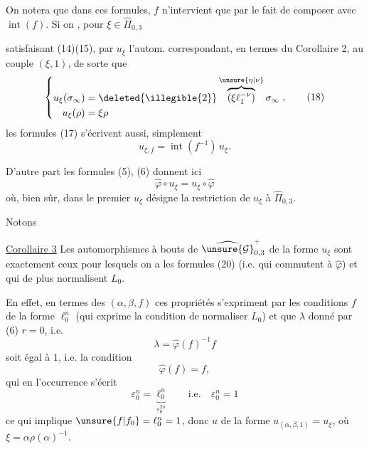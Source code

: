 On notera que dans ces formules, $f$ n'intervient que par le fait de
composer avec $\operatorname{int}(f)$. Si on
, pour $\xi\in\widehat\Pi_{0,3}$


satisfaisant (14)(15), par $u_\xi$ l'autom.
 correspondant, en termes du
Corollaire 2, au couple $(\xi,1)$, de sorte que
\[
\left\{\begin{aligned}
u_\xi(\sigma_\infty)
 &=\deleted{\illegible{2}}
 \overbrace{(\xi\ell_1^{-\nu})}^{\unsure{\eta|\nu}}\sigma_\infty\\
u_\xi(\rho)&=\xi\rho
\end{aligned}\right.,
\tag{18}
\]
les formules (17) s'écrivent aussi, simplement
\[
u_{\xi,f}=\operatorname{int}(f^{-1})\,u_\xi.
\tag{19}
\]

D'autre part les formules (5), (6) donnent ici
\[
\widehat\varphi\circ u_\xi=u_\xi\circ\widehat\varphi
\tag{20}
\]
où, bien sûr, dans le premier  $u_\xi$ désigne la
restriction de $u_\xi$ à $\widehat\Pi_{0,3}$.

Notons

\uline{Corollaire 3} Les automorphismes à bouts de
$\widehat{\unsure{\mathcal G}}_{0,3}^{+}$ de la forme $u_\xi$
 sont exactement ceux pour
lesquels on a les  formules (20) (i.e. qui
 commutent à $\widehat\varphi$) et qui de plus
normalisent $L_0$.


En effet, en termes des  $(\alpha,\beta,f)$  ces propriétés s'expriment par les conditions   $f$ de la forme $\ell_0^n$ (qui exprime la condition de normaliser $L_0$) et que $\lambda$ donné par (6) \uline{} $r=0$, i.e.
\[
\lambda=\widehat\varphi(f)^{-1}f
\tag{21}
\]
soit égal à $1$, i.e. la condition
\[
\widehat\varphi(f)=f,
\tag{22}
\]
qui en l'occurrence s'écrit
\[
\varepsilon_0^n=\underbrace{\ell_0^n}_{\varepsilon_0^{2n}}
\qquad\text{i.e.}\quad \varepsilon_0^n=1
\]
ce qui implique $\unsure{f|f_0}=\ell_0^n=1$, donc $u$ de la forme $u_{(\alpha,\beta,1)}=u_\xi$, où $\xi=\alpha\rho(\alpha)^{-1}$.

